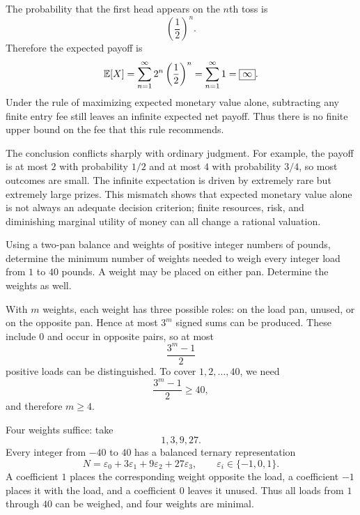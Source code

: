     \begin{solution}
        The probability that the first head appears on the $n$th toss is
        \[
            \left(\frac12\right)^n.
        \]
        Therefore the expected payoff is
        \[
            \mathbb{E}[X]
            =
            \sum_{n=1}^{\infty}
            2^n\left(\frac12\right)^n
            =
            \sum_{n=1}^{\infty}1
            =
            \boxed{\infty}.
        \]
        Under the rule of maximizing expected monetary value alone, subtracting
        any finite entry fee still leaves an infinite expected net payoff.
        Thus there is no finite upper bound on the fee that this rule recommends.

        The conclusion conflicts sharply with ordinary judgment. For example,
        the payoff is at most $2$ with probability $1/2$ and at most $4$ with
        probability $3/4$, so most outcomes are small. The infinite expectation
        is driven by extremely rare but extremely large prizes. This mismatch
        shows that expected monetary value alone is not always an adequate
        decision criterion; finite resources, risk, and diminishing marginal
        utility of money can all change a rational valuation.
    \end{solution}

    \begin{expectedproblem}
        Using a two-pan balance and weights of positive integer numbers of
        pounds, determine the minimum number of weights needed to weigh every
        integer load from $1$ to $40$ pounds. A weight may be placed on either
        pan. Determine the weights as well.
    \end{expectedproblem}

    \begin{solution}
        With $m$ weights, each weight has three possible roles: on the load pan,
        unused, or on the opposite pan. Hence at most $3^m$ signed sums can be
        produced. These include $0$ and occur in opposite pairs, so at most
        \[
            \frac{3^m-1}{2}
        \]
        positive loads can be distinguished. To cover $1,2,\ldots,40$, we need
        \[
            \frac{3^m-1}{2}\geq40,
        \]
        and therefore $m\geq4$.

        Four weights suffice: take
        \[
            \boxed{1,3,9,27}.
        \]
        Every integer from $-40$ to $40$ has a balanced ternary representation
        \[
            N=\varepsilon_0+3\varepsilon_1+9\varepsilon_2+27\varepsilon_3,
            \qquad
            \varepsilon_i\in\{-1,0,1\}.
        \]
        A coefficient $1$ places the corresponding weight opposite the load,
        a coefficient $-1$ places it with the load, and a coefficient $0$
        leaves it unused. Thus all loads from $1$ through $40$ can be weighed,
        and four weights are minimal.
    \end{solution}

